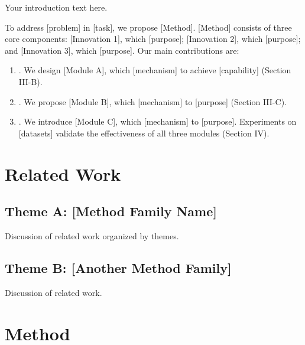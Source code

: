 \documentclass[10pt,twocolumn,letterpaper]{article}
\begin{document}
Your introduction text here.

To address [problem] in [task], we propose [Method]. [Method] consists of three
core components: [Innovation 1], which [purpose]; [Innovation 2], which [purpose];
and [Innovation 3], which [purpose]. Our main contributions are:
\begin{enumerate}
  \item [Innovation 1 contribution]. We design [Module A], which [mechanism]
        to achieve [capability] (Section III-B).
  \item [Innovation 2 contribution]. We propose [Module B], which [mechanism]
        to [purpose] (Section III-C).
  \item [Innovation 3 contribution]. We introduce [Module C], which [mechanism]
        to [purpose]. Experiments on [datasets] validate the effectiveness of
        all three modules (Section IV).
\end{enumerate}

\section{Related Work}
\label{sec:related}


\subsection{Theme A: [Method Family Name]}

Discussion of related work organized by themes.

\subsection{Theme B: [Another Method Family]}

Discussion of related work.

\section{Method}
\label{sec:method}
\end{document}
